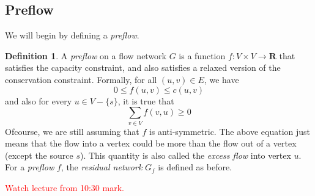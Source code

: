 \documentclass[12pt,a4paper]{amsart}
\numberwithin{equation}{section}
\theoremstyle{definition}
\newtheorem{Def}{Definition}[section]
\begin{document}
\subsection{Preflow} We will begin by defining a \textit{preflow}.

\begin{Def}
	A \textit{preflow} on a flow network $G$ is a function $f:V\times V\to \textbf{R}$ that satisfies the capacity constraint, and also satisfies a relaxed version of the conservation constraint. Formally, for all $(u, v)\in E$, we have $$0\le f(u, v)\le c(u, v)$$
	and also for every $u\in V-\{s\}$, it is true that 
	$$\sum_{v\in V}f(v, u)\ge 0$$
	Ofcourse, we are still assuming that $f$ is anti-symmetric. The above equation just means that the flow into a vertex could be more than the flow out of a vertex (except the source $s$). This quantity is also called the \textit{excess flow} into vertex $u$. For a \textit{preflow} $f$, the \textit{residual network} $G_f$ is defined as before. 
\end{Def}

\textcolor{red}{Watch lecture from 10:30 mark.}
\end{document}
